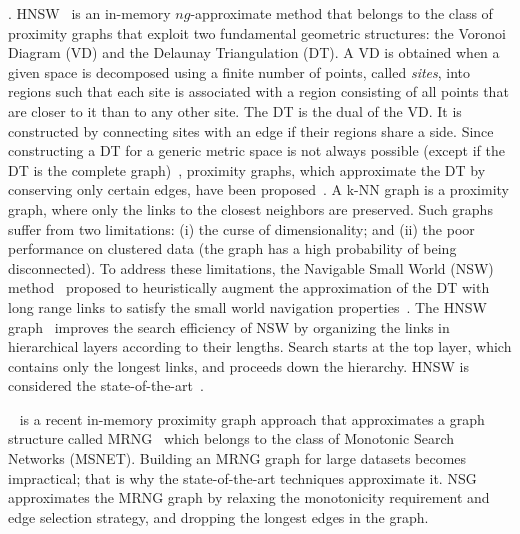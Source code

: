 . 
HNSW~\cite{journal/corr/malkov16} is an {\color{black} in-memory} $ng$-approximate method that belongs to the class of proximity graphs that exploit two fundamental geometric structures: the Voronoi Diagram (VD) and the Delaunay Triangulation (DT). 
A VD is obtained when a given space is decomposed using a finite number of points, called \emph{sites}, into regions such that each site is associated with a region consisting of all points that are closer to it than to any other site. 
The DT is the dual of the VD.
It is constructed by connecting sites with an edge if their regions share a side. %
Since constructing a DT for a generic metric space is not always possible (except if the DT is the complete graph)~\cite{journal/vldbj/navarro2002}, proximity graphs, which approximate the DT by conserving only certain edges, have been proposed~\cite{conf/siam/arya1993,journal/apr/chavez2010,conf/sigkdd/aoyama2011,conf/iccv/wang2013,journal/is/malkov2014,conf/sisap/chavez2015,conf/icmm/jiang2016,journal/corr/malkov16}. 
A k-NN graph is a proximity graph, where only the links to the closest neighbors are preserved. 
Such graphs suffer from two limitations: (i) the curse of dimensionality; and (ii) the poor performance on clustered data (the graph has a high probability of being disconnected). 
To address these limitations, the Navigable Small World (NSW) method~\cite{journal/is/malkov2014} proposed to heuristically augment the approximation of the DT with long range links to satisfy 
the small world navigation properties~\cite{conf/stoc/kleinberg2000}.  
The HNSW graph~\cite{journal/corr/malkov16} improves the search efficiency of NSW 
by organizing the links in hierarchical layers according to their lengths. 
Search starts at the top layer, which contains only the longest links, and proceeds down the hierarchy. %
HNSW %
is considered the state-of-the-art~\cite{conf/sisap/martin17}. 

{\color {black} ~\cite{nsg} is a recent in-memory proximity graph approach that approximates a graph structure called MRNG~\cite{nsg} which belongs to the class of Monotonic Search Networks (MSNET). 
Building an MRNG graph for large datasets becomes impractical; that is why the state-of-the-art techniques approximate it. NSG approximates the MRNG graph by relaxing the monotonicity requirement and edge selection strategy, and dropping the longest edges in the graph.}


